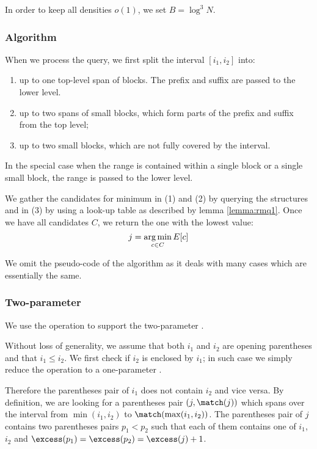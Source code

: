 In order to keep all densities $o(1)$, we set $B = \log^3 N$.

\subsubsection{Algorithm}

When we process the query, we first split the interval $[i_1, i_2]$ into:
\begin{enumerate}
	\item up to one top-level span of blocks.
	The prefix and suffix are passed to the lower level.
	\item up to two spans of small blocks, which form parts of the prefix and suffix from the top level;
	\item up to two small blocks, which are not fully covered by the interval.
\end{enumerate}
In the special case when the range is contained within a single block or a single small block, the range is passed to the lower level.

We gather the candidates for minimum in (1) and (2) by querying the \rmqi{} structures and in (3) by using a look-up table as described by lemma \ref{lemma:rmq1}.
Once we have all candidates $C$, we return the one with the lowest value:
$$ j = \operatorname*{arg\,min}_{c \in C} E[c] $$

We omit the pseudo-code of the algorithm as it deals with many cases which are essentially the same.

\subsubsection{\label{ss:enclose2}Two-parameter \enclose}

We use the operation \rmqi{} to support the two-parameter \enclose{}.

Without loss of generality, we assume that both $i_1$ and $i_2$ are opening parentheses and that $i_1 \le i_2$.
We first check if $i_2$ is enclosed by $i_1$; in such case we simply reduce the operation to a one-parameter \enclose{}.

Therefore the parentheses pair of $i_1$ does not contain $i_2$ and vice versa.
By definition, we are looking for a parentheses pair $(j, \match(j))$ which spans over the interval from $\min(i_1, i_2)$ to $\match(\max(i_1, i_2))$.
The parentheses pair of $j$ contains two parentheses pairs $p_1 < p_2$ such that each of them contains one of $i_1$, $i_2$ and $\excess(p_1) = \excess(p_2) = \excess(j) + 1$.

